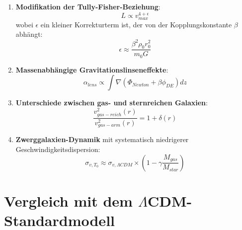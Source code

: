 \documentclass[a4paper,12pt]{article}
\begin{document}
	\begin{enumerate}
		\item \textbf{Modifikation der Tully-Fisher-Beziehung}:
		\begin{equation}
			L \propto v_{max}^{4+\epsilon}
		\end{equation}
		wobei $\epsilon$ ein kleiner Korrekturterm ist, der von der Kopplungskonstante $\beta$ abhängt:
		\begin{equation}
			\epsilon \approx \frac{\beta^2 \rho_0 r_0^2}{m_0 G}
		\end{equation}
		
		\item \textbf{Massenabhängige Gravitationslinseneffekte}:
		\begin{equation}
			\alpha_{lens} \propto \int \nabla(\Phi_{Newton} + \beta\phi_{DE}) dz
		\end{equation}
		
		\item \textbf{Unterschiede zwischen gas- und sternreichen Galaxien}:
		\begin{equation}
			\frac{v^2_{gas-reich}(r)}{v^2_{gas-arm}(r)} = 1 + \delta(r)
		\end{equation}
		
		\item \textbf{Zwerggalaxien-Dynamik} mit systematisch niedrigerer Geschwindigkeitsdispersion:
		\begin{equation}
			\sigma_{v,T_0} \approx \sigma_{v,\Lambda CDM} \times \left(1 - \gamma \frac{M_{gas}}{M_{star}}\right)
		\end{equation}
	\end{enumerate}
	
	\section{Vergleich mit dem $\Lambda$CDM-Standardmodell}
	
\end{document}
